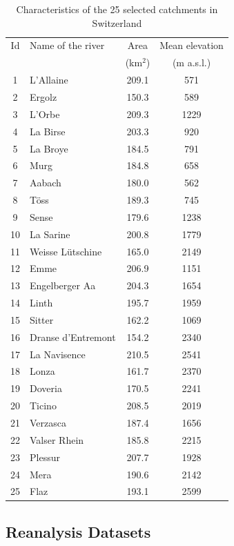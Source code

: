 \documentclass[draft]{agujournal2019}
\begin{document}
\begin{table}
	\centering
	\caption{Characteristics of the 25 selected catchments in Switzerland}
	\begin{tabular}{clcc}
		\hline 
		Id & Name of the river & Area & Mean elevation \\
		&  & (km$^2$) & (m a.s.l.) \\
		\hline 
		1 & L'Allaine & 209.1 & 571 \\
		2 & Ergolz & 150.3 & 589 \\
		3 & L'Orbe & 209.3 & 1229 \\
		4 & La Birse & 203.3 & 920 \\
		5 & La Broye & 184.5 & 791 \\
		6 & Murg & 184.8 & 658 \\
		7 & Aabach & 180.0 & 562 \\
		8 & T\"oss & 189.3 & 745 \\
		9 & Sense & 179.6 & 1238 \\
		10 & La Sarine & 200.8 & 1779 \\
		11 & Weisse L\"utschine & 165.0 & 2149 \\
		12 & Emme & 206.9 & 1151 \\
		13 & Engelberger Aa & 204.3 & 1654 \\
		14 & Linth & 195.7 & 1959 \\
		15 & Sitter & 162.2 & 1069 \\
		16 & Dranse d'Entremont & 154.2 & 2340 \\
		17 & La Navisence & 210.5 & 2541 \\
		18 & Lonza & 161.7 & 2370 \\
		19 & Doveria & 170.5 & 2241 \\
		20 & Ticino & 208.5 & 2019 \\
		21 & Verzasca & 187.4 & 1656 \\
		22 & Valser Rhein & 185.8 & 2215 \\
		23 & Plessur & 207.7 & 1928 \\
		24 & Mera & 190.6 & 2142 \\
		25 & Flaz & 193.1 & 2599 \\
		\hline 
	\end{tabular} 
	\label{catchments}
\end{table}


\subsection{Reanalysis Datasets}
\label{reanalyses}
\end{document}

